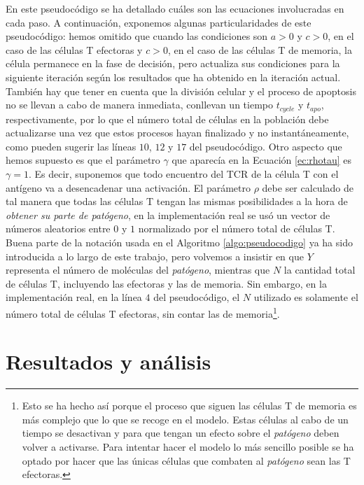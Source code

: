 En este pseudocódigo se ha detallado cuáles son las ecuaciones involucradas en cada paso. A continuación, exponemos algunas particularidades de este pseudocódigo: hemos omitido que cuando las condiciones son $a > 0$ y $c > 0$, en el caso de las células T efectoras y $c > 0$, en el caso de las células T de memoria, la célula permanece en la fase de decisión, pero actualiza sus condiciones para la siguiente iteración según los resultados que ha obtenido en la iteración actual. También hay que tener en cuenta que la división celular y el proceso de apoptosis no se llevan a cabo de manera inmediata, conllevan un tiempo $t_{cycle}$ y $t_{apo}$, respectivamente, por lo que el número total de células en la población debe actualizarse una vez que estos procesos hayan finalizado y no instantáneamente, como pueden sugerir las líneas $10$, $12$ y $17$ del pseudocódigo. Otro aspecto que hemos supuesto es que el parámetro $\gamma$ que aparecía en la Ecuación \ref{ec:rhotau} es $\gamma = 1$. Es decir, suponemos que todo encuentro del TCR de la célula T con el antígeno va a desencadenar una activación. El parámetro $\rho$ debe ser calculado de tal manera que todas las células T tengan las mismas posibilidades a la hora de \textit{obtener su parte de \textit{patógeno}}, en la implementación real se usó un vector de números aleatorios entre $0$ y $1$ normalizado por el número total de células T. Buena parte de la notación usada en el Algoritmo \ref{algo:pseudocodigo} ya ha sido introducida a lo largo de este trabajo, pero volvemos a insistir en que $Y$ representa el número de moléculas del \textit{patógeno}, mientras que $N$ la cantidad total de células T, incluyendo las efectoras y las de memoria. Sin embargo, en la implementación real, en la línea $4$ del pseudocódigo, el $N$ utilizado es solamente el número total de células T efectoras, sin contar las de memoria\footnote{Esto se ha hecho así porque el proceso que siguen las células T de memoria es más complejo que lo que se recoge en el modelo. Estas células al cabo de un tiempo se desactivan y para que tengan un efecto sobre el \textit{patógeno} deben volver a activarse. Para intentar hacer el modelo lo más sencillo posible se ha optado por hacer que las únicas células que combaten al \textit{patógeno} sean las T efectoras.}.


\section{Resultados y análisis}
\label{sec:simulacionesMicro}

